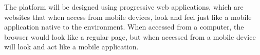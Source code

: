 \quad \quad The platform will be designed using progressive web applications, which 
are websites that when access from mobile devices, look and feel just like a mobile 
application native to the environment. When accessed from a computer, the browser 
would look like a regular page, but when accessed from a mobile device will look and 
act like a mobile application.
